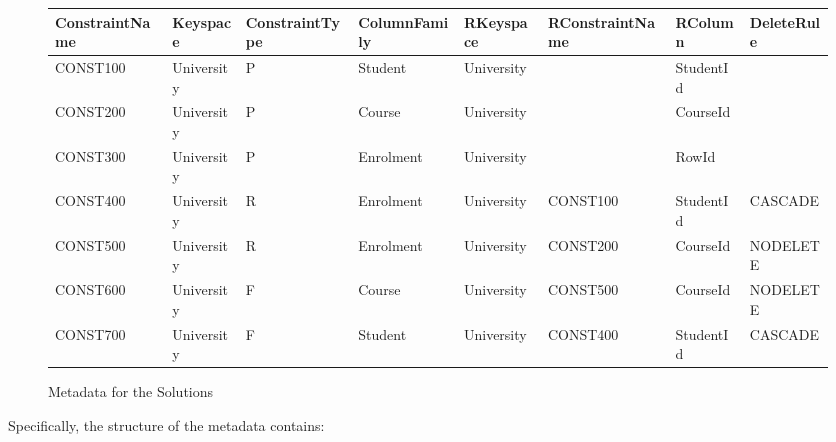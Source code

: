 \begin{figure}[h] 
	\centering
	
	\begin{tabular}{CCC CCC CC}
		\toprule
		\bfseries ConstraintName & \bfseries Keyspace & \bfseries ConstraintType &
		\bfseries ColumnFamily & \bfseries RKeyspace & \bfseries RConstraintName &
		\bfseries RColumn & \bfseries DeleteRule\\
		\midrule
		CONST100 & University & P & Student & University & & StudentId &\\
		\rc CONST200 & University & P & Course & University & & CourseId &\\
		CONST300 & University & P & Enrolment & University & & RowId &\\
		\rc CONST400 & University & R & Enrolment & University & CONST100 & StudentId
		& CASCADE\\
		CONST500 & University & R & Enrolment & University & CONST200 & CourseId &
		NODELETE\\
		\rc CONST600 & University & F & Course & University & CONST500 & CourseId &
		NODELETE\\
		CONST700 & University & F & Student & University & CONST400 & StudentId &
		CASCADE\\
		\bottomrule
	\end{tabular}
	\caption{Metadata for the Solutions}\label{fd:Metadata-Constraints}
\end{figure}


Specifically, the structure of the metadata contains:

